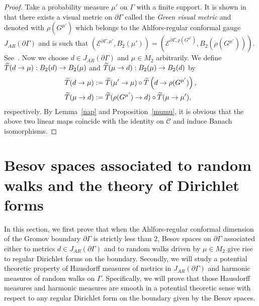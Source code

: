 \documentclass[AHL,Unicode,longabstracts,published]{cedram}
\newcommand{\ce}{\mathcal{E}}
\newcommand{\cC}{\mathcal{C}}
\let\oldtilde\tilde
\renewcommand*{\tilde}[1]{\mathchoice{\widetilde{#1}}{\widetilde{#1}}{\oldtilde{#1}}{\oldtilde{#1}}}
\begin{document}
\begin{proof}
Take a probability measure $\mu'$ on $\Gamma$ with a finite support. It is shown in~\cite{BHM} that there exists a visual metric on $\partial\Gamma$ called the \emph{Green visual metric} and denoted with $\rho(G^{\mu'})$ which belongs to the Ahlfors-regular conformal gauge $J_{AR}(\partial\Gamma)$ and is such that $(\ce^{\partial\Gamma,\mu'},B_2(\mu'))=(\ce^{\partial\Gamma,\rho(G^{\mu'})},B_2(\rho(G^{\mu'})))$. See~\cite[Corollary~1.2 and Section~3.2]{BHM}. Now we choose $d\in J_{AR}(\partial\Gamma)$ and $\mu\in M_2$ arbitrarily. We define $\tilde{T}(d\rightarrow\mu): B_2(d)\rightarrow B_2(\mu)$ and $\tilde{T}(\mu\rightarrow d): B_2(\mu)\rightarrow B_2(d)$ by
\begin{align*}
\tilde{T}(d\rightarrow\mu)&:=\tilde{T}(\mu'\to\mu)\circ \tilde{T}\left(d\to \rho(G^{\mu'})\right),\\
\tilde{T}(\mu\rightarrow d)&:=\tilde{T}(\rho(G^{\mu'})\to d)\circ \tilde{T}(\mu\to\mu'),
\end{align*}
respectively. By Lemma~\ref{nap} and Proposition~\ref{mumu}, it is obvious that the above two linear maps coincide with the identity on $\cC$ and induce Banach isomorphisms.
\end{proof}

\section{Besov spaces associated to random walks and the theory of Dirichlet forms}\label{besov-rw}
In this section, we first prove that when the Ahlfors-regular conformal dimension of the Gromov boundary $\partial\Gamma$ is strictly less than $2$, Besov spaces on $\partial\Gamma$ associated either to metrics $d\in J_{AR}(\partial\Gamma)$ and to random walks driven by $\mu\in M_2$ give rise to regular Dirichlet forms on the boundary. Secondly, we will study a potential theoretic property of Hausdorff measures of metrics in $J_{AR}(\partial\Gamma)$ and harmonic measures of random walks on $\Gamma$. Specifically, we will prove that those Hausdorff measures and harmonic measures are smooth in a potential theoretic sense with respect to any regular Dirichlet form on the boundary given by the Besov spaces.
\end{document}
